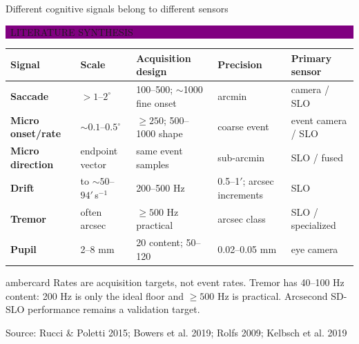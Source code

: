 \documentclass[aspectratio=169,9pt,xcolor=table]{beamer}
\newcommand{\evidence}[2]{%
  \vspace{-0.06cm}\hfill
  \colorbox{#2}{\color{white}\bfseries\scriptsize\strut\ #1\ }\par
  \vspace{0.04cm}
}
\newcommand{\source}[1]{\vfill{\color{Mid}\tiny Source: #1}}
\begin{document}
\begin{frame}{Different cognitive signals belong to different sensors}
  \evidence{LITERATURE SYNTHESIS}{Purple}
  \scriptsize
  \renewcommand{\arraystretch}{1.32}
  \begin{tabularx}{\textwidth}{>{\bfseries}l l l l X}
    \toprule
    Signal & Scale & Acquisition design & Precision & Primary sensor\\
    \midrule
    Saccade & $>1$--$2^\circ$ & 100--500; $\sim$1000 fine onset & arcmin & camera / SLO\\
    Micro onset/rate & $\sim0.1$--$0.5^\circ$ & $\geq250$; 500--1000 shape & coarse event & event camera / SLO\\
    Micro direction & endpoint vector & same event samples & sub-arcmin & SLO / fused\\
    Drift & to $\sim50$--$94'$\,s$^{-1}$ & 200--500 Hz & 0.5--1$'$; arcsec increments & SLO\\
    Tremor & often arcsec & $\geq500$ Hz practical & arcsec class & SLO / specialized\\
    Pupil & 2--8 mm & 20 content; 50--120 & 0.02--0.05 mm & eye camera\\
    \bottomrule
  \end{tabularx}
  \vspace{0.24cm}
  \begin{beamercolorbox}[rounded=true,sep=.14cm]{ambercard}
    \scriptsize Rates are acquisition targets, not event rates. Tremor has 40--100 Hz content:
    200 Hz is only the ideal floor and $\geq500$ Hz is practical.
    Arcsecond SD-SLO performance remains a validation target.
  \end{beamercolorbox}
  \source{Rucci \& Poletti 2015; Bowers et al. 2019; Rolfs 2009; Kelbsch et al. 2019}
\end{frame}
\end{document}
